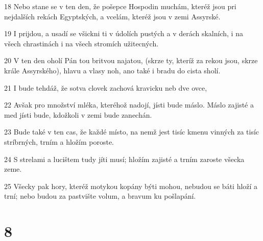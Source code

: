 \par 18 Nebo stane se v ten den, že pošepce Hospodin muchám, kteréž jsou pri nejdalších rekách Egyptských, a vcelám, kteréž jsou v zemi Assyrské.
\par 19 I prijdou, a usadí se všickni ti v údolích pustých a v derách skalních, i na všech chrastinách i na všech stromích užitecných.
\par 20 V ten den oholí Pán tou britvou najatou, (skrze ty, kteríž za rekou jsou, skrze krále Assyrského), hlavu a vlasy noh, ano také i bradu do cista sholí.
\par 21 I bude tehdáž, že sotva clovek zachová kravicku neb dve ovce,
\par 22 Avšak pro množství mléka, kteréhož nadojí, jísti bude máslo. Máslo zajisté a med jísti bude, kdožkoli v zemi bude zanechán.
\par 23 Bude také v ten cas, že každé místo, na nemž jest tisíc kmenu vinných za tisíc stríbrných, trním a hložím poroste.
\par 24 S strelami a lucištem tudy jíti musí; hložím zajisté a trním zaroste všecka zeme.
\par 25 Všecky pak hory, kteréž motykou kopány býti mohou, nebudou se báti hloží a trní; nebo budou za pastvište volum, a bravum ku pošlapání.

\chapter{8}

